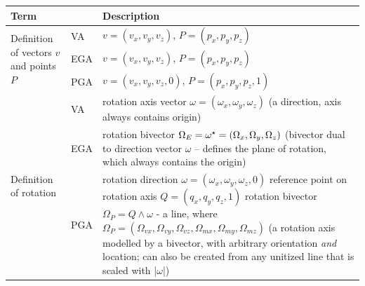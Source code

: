 \newlength{\cwAppPhys}\setlength{\cwAppPhys}{0.16\textwidth}
\newlength{\cwTagPhys}\setlength{\cwTagPhys}{0.07\textwidth}
\newlength{\cwDescPhys}\setlength{\cwDescPhys}{\dimexpr\textwidth - \cwAppPhys -
\cwTagPhys - 4\arrayrulewidth - 6\tabcolsep\relax}
\begin{table}[H]
{\setlength{\extrarowheight}{2pt}\renewcommand{\arraystretch}{1.15}%
\begin{tabular}{|p{\cwAppPhys}|p{\cwTagPhys}|p{\cwDescPhys}|}
    \hline
    \textbf{Term} & & \textbf{Description} \\
    \hline \hline
    \multirow{3}{\cwAppPhys}{Definition of vectors $v$ and points $P$}
    & VA  & $v=(v_x, v_y, v_z)$, $P=(p_x, p_y, p_z)$ \\
    \cline{2-3}
    & EGA & $v=(v_x, v_y, v_z)$, $P=(p_x, p_y, p_z)$ \\
    \cline{2-3}
    & PGA & $v=(v_x, v_y, v_z, 0)$, $P=(p_x, p_y, p_z, 1)$ \\
    \hline \hline
    \multirow{3}{\cwAppPhys}{Definition of rotation}
    & VA  & rotation axis vector $\omega = (\omega_x,\omega_y,\omega_z)$\newline
    (a direction, axis always contains origin)\\
    \cline{2-3}
    & EGA & rotation bivector $\Omega_{E} = {\omega}^\star =
    (\Omega_x,\Omega_y,\Omega_z)$\newline
    (bivector dual to direction vector $\omega$ -- defines the plane of rotation, which
    always contains the origin)\\
    \cline{2-3}
    & PGA & rotation direction $\omega = (\omega_x,\omega_y,\omega_z, 0)$ \newline
    reference point on rotation axis $Q = (q_x,q_y,q_z, 1)$
    rotation bivector $\Omega_{P} = Q \wedge \omega $ - a line, where
    \newline
    $\Omega_{P} = (\Omega_{vx},\Omega_{vy},\Omega_{vz},
    \Omega_{mx},\Omega_{my},\Omega_{mz})$
    \newline
    (a rotation axis modelled by a bivector, with arbitrary orientation \emph{and}
    location; can also be created from any unitized line that is scaled with |$\omega$|)\\

\end{tabular}}
\end{table}
